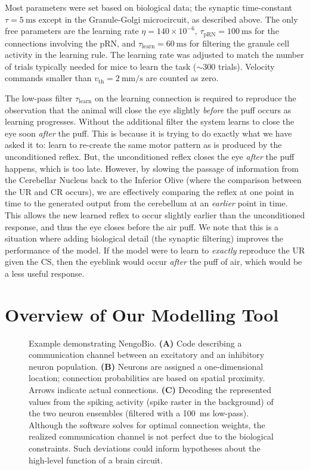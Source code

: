 Most parameters were set based on biological data; the synaptic time-constant $\tau = \SI{5}{\milli\second}$ except in the Granule-Golgi microcircuit, as described above.
The only free parameters are the learning rate $\eta=140\times 10^{-6}$, $\tau_\mathrm{pRN} = \SI{100}{\milli\second}$ for the connections involving the pRN, and $\tau_\mathrm{learn} = \SI{60}{\milli\second}$ for filtering the granule cell activity in the learning rule.
The learning rate was adjusted to match the number of trials typically needed for mice to learn the task ($\sim 300$ trials).
Velocity commands smaller than $v_\mathrm{th} = \SI{2}{\milli\metre\per\second}$ are counted as zero.

The low-pass filter $\tau_\mathrm{learn}$ on the learning connection is required to reproduce the observation that the animal will close the eye slightly \emph{before} the puff occurs as learning progresses.
Without the additional filter the system learns to close the eye soon \emph{after} the puff.  This is because it is trying to do exactly what we have asked it to: learn to re-create the same motor pattern as is produced by the unconditioned reflex.  But, the unconditioned reflex closes the eye \emph{after} the puff happens, which is too late.  However, by slowing the passage of information from the Cerebellar Nucleus back to the Inferior Olive (where the comparison between the UR and CR occurs), we are effectively comparing the reflex at one point in time to the generated output from the cerebellum at an \emph{earlier} point in time.  This allows the new learned reflex to occur slightly earlier than the unconditioned response, and thus the eye closes before the air puff.  We note that this is a situation where adding biological detail (the synaptic filtering) improves the performance of the model.  If the model were to learn to \textit{exactly} reproduce the UR given the CS, then the eyeblink would occur \textit{after} the puff of air, which would be a less useful response.

\section{Overview of Our Modelling Tool}

\begin{figure}[t]
    \caption[Example demonstrating NengoBio.]{Example demonstrating NengoBio. \textbf{(A)} Code describing a communication channel between an excitatory and an inhibitory neuron population. \textbf{(B)} Neurons are assigned a one-dimensional location; connection probabilities are based on spatial proximity. Arrows indicate actual connections. \textbf{(C)} Decoding the represented values from the spiking activity (spike raster in the background) of the two neuron ensembles (filtered with a \SI{100}{\milli\second} low-pass). Although the software solves for optimal connection weights, the realized communication channel is not perfect due to the biological constraints. Such deviations could inform hypotheses about the high-level function of a brain circuit.}
    \label{fig:nengo_bio_example}
\end{figure}

